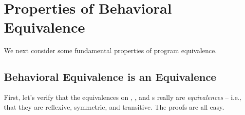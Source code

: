 \documentclass[12pt]{report}
\begin{document}
\section{Properties of Behavioral Equivalence}



 We next consider some fundamental properties of program
    equivalence. 
\begin{coqdoccode}
\coqdocemptyline
\end{coqdoccode}
\subsection{Behavioral Equivalence is an Equivalence}



 First, let's verify that the equivalences on , , and
    s really are \textit{equivalences} -- i.e., that they are reflexive,
    symmetric, and transitive.  The proofs are all easy. 
\end{document}
